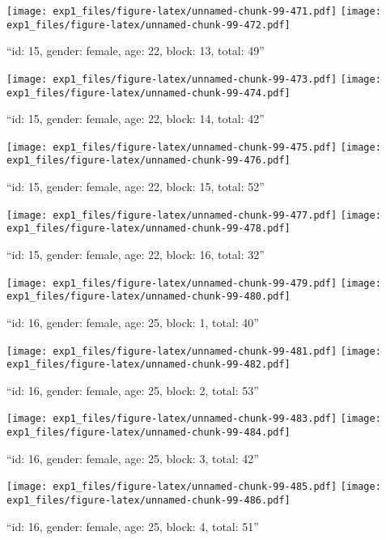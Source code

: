 \documentclass[,]{article}
\begin{document}
\texttt{[image: exp1\_files/figure-latex/unnamed-chunk-99-471.pdf]}
\texttt{[image: exp1\_files/figure-latex/unnamed-chunk-99-472.pdf]}

\newpage
[1] 

``id: 15, gender: female, age: 22, block: 13, total: 49''

\texttt{[image: exp1\_files/figure-latex/unnamed-chunk-99-473.pdf]}
\texttt{[image: exp1\_files/figure-latex/unnamed-chunk-99-474.pdf]}

\newpage
[1] 

``id: 15, gender: female, age: 22, block: 14, total: 42''

\texttt{[image: exp1\_files/figure-latex/unnamed-chunk-99-475.pdf]}
\texttt{[image: exp1\_files/figure-latex/unnamed-chunk-99-476.pdf]}

\newpage
[1] 

``id: 15, gender: female, age: 22, block: 15, total: 52''

\texttt{[image: exp1\_files/figure-latex/unnamed-chunk-99-477.pdf]}
\texttt{[image: exp1\_files/figure-latex/unnamed-chunk-99-478.pdf]}

\newpage
[1] 

``id: 15, gender: female, age: 22, block: 16, total: 32''

\texttt{[image: exp1\_files/figure-latex/unnamed-chunk-99-479.pdf]}
\texttt{[image: exp1\_files/figure-latex/unnamed-chunk-99-480.pdf]}

\newpage
[1] 

``id: 16, gender: female, age: 25, block: 1, total: 40''

\texttt{[image: exp1\_files/figure-latex/unnamed-chunk-99-481.pdf]}
\texttt{[image: exp1\_files/figure-latex/unnamed-chunk-99-482.pdf]}

\newpage
[1] 

``id: 16, gender: female, age: 25, block: 2, total: 53''

\texttt{[image: exp1\_files/figure-latex/unnamed-chunk-99-483.pdf]}
\texttt{[image: exp1\_files/figure-latex/unnamed-chunk-99-484.pdf]}

\newpage
[1] 

``id: 16, gender: female, age: 25, block: 3, total: 42''

\texttt{[image: exp1\_files/figure-latex/unnamed-chunk-99-485.pdf]}
\texttt{[image: exp1\_files/figure-latex/unnamed-chunk-99-486.pdf]}

\newpage
[1] 

``id: 16, gender: female, age: 25, block: 4, total: 51''
\end{document}
